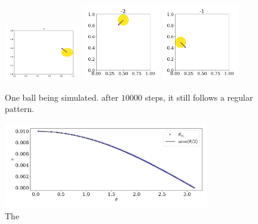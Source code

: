 \documentclass{article}
\begin{document}
        \begin{figure}
            \centering
            \includegraphics[width=0.3\textwidth]{../plots/test_case_one_particle/particle-3.pdf}
            \includegraphics[width=0.3\textwidth]{../plots/test_case_one_particle/particle-2.pdf}
            \includegraphics[width=0.3\textwidth]{../plots/test_case_one_particle/particle-1.pdf}
            \caption{One ball being simulated. after $10 000$ steps, it still follows a regular pattern.}
            \label{single particle}
        \end{figure}

        \begin{figure}
            \centering
            \includegraphics[width=0.8\textwidth]{../plots/test_case_collision_angle/collision_angle.pdf}
            \caption{The }
            \label{scattering}
        \end{figure}
\end{document}
